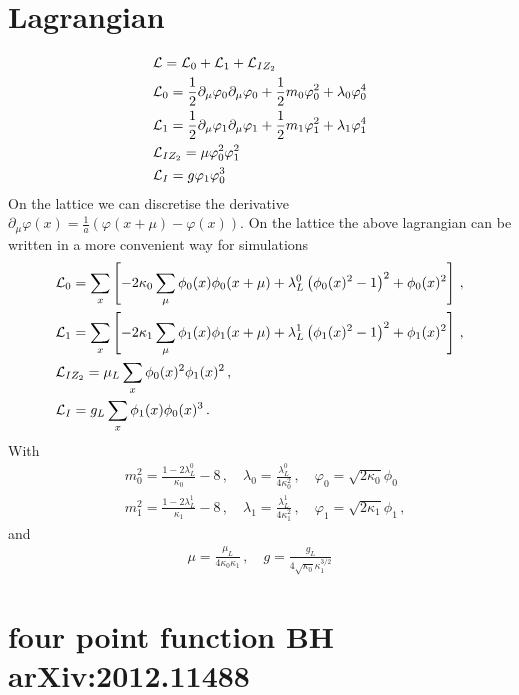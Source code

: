 \documentclass[10pt,a4paper]{article}
\begin{document}
 
 \section{Lagrangian}
 \begin{align}
 & {\cal L}= {\cal L}_0+ {\cal L}_1+  {\cal L}_{IZ_2} \\
 &{\cal L}_0= \frac{1}{2} \partial_\mu \varphi_0\partial_\mu \varphi_0 +\frac{1}{2}m_0 \varphi_0^2 +\lambda_0 \varphi_0^4 \\
 &{\cal L}_1=\frac{1}{2} \partial_\mu \varphi_1\partial_\mu \varphi_1 +\frac{1}{2}m_1 \varphi_1^2+\lambda_1 \varphi_1^4 \\
 &{\cal L}_{IZ_2}= \mu \varphi_0^2 \varphi_1^2 \\
  &{\cal L}_{I}= g \varphi_1 \varphi_0^3
 \end{align}
On the lattice we can discretise the derivative $\partial_\mu \varphi(x)=\frac{1}{a}(\varphi(x+\mu)-\varphi(x)) $.
On the lattice the above lagrangian can be written in a more convenient way for simulations
\begin{align}
 &{\cal L}_0= \sum_{x}\left[ -2\kappa_0\sum_\mu \phi_0(x) \phi_0({x+\mu}) +\lambda_L^0 \left( \phi_0(x)^2-1\right)^2+ \phi_0(x)^2  \right]\,,\\
 &{\cal L}_1= \sum_{x}\left[ -2\kappa_1\sum_\mu \phi_1(x) \phi_1({x+\mu}) +\lambda_L^1 \left( \phi_1(x)^2-1\right)^2+ \phi_1(x)^2  \right]\,,\\
 &{\cal L}_{IZ_2}= \mu_L  \sum_{x} \phi_0(x)^2 \phi_1(x)^2 \,,\\
  &{\cal L}_{I}= g_L \sum_{x} \phi_1(x) \phi_0(x)^3 \,.
 \end{align}
With
\begin{align}
& m_0^2=\frac{1-2\lambda_L^0}{\kappa_0}-8\,,\quad \lambda_0=\frac{\lambda_L^0}{4\kappa_0^2}\,,\quad \varphi_0=\sqrt{2\kappa_0}\phi_0\\
& m_1^2=\frac{1-2\lambda_L^1}{\kappa_1}-8\,,\quad \lambda_1=\frac{\lambda_L^1}{4\kappa_1^2}
\,,\quad \varphi_1=\sqrt{2\kappa_1}\phi_1 \,,
 \end{align}
 and
 \begin{align}
\mu=\frac{\mu_L}{4\kappa_0\kappa_1} \,,\quad g=\frac{g_L}{4\sqrt{\kappa_0}\kappa_1^{3/2}}
 \end{align}
 
\section{four point function BH arXiv:2012.11488}
 
\end{document}
